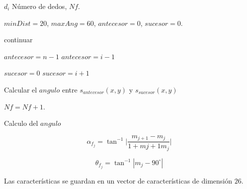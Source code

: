 \begin{algorithm}
\begin{algorithmic}[1]

\REQUIRE $d_i$
\ENSURE Número de dedos, $Nf$.  

	\STATE $minDist=20$, $maxAng=60$, $antecesor=0$, $sucesor=0$. 	
	
	\STATE continuar
	\ENDIF 
	
	\STATE $antecesor=n-1$
	\ELSE
	\STATE $antecesor=i-1$
	\ENDIF 

	\STATE $sucesor=0$
	\ELSE
	\STATE $sucesor=i+1$
	\ENDIF   
	
	\STATE Calcular el $angulo$ entre $s_{antecesor}(x,y)$ y $s_{sucesor}(x,y)$
	
	\RETURN \FALSE
	\ENDIF  
	
	\STATE $Nf=Nf+1$.

\ENDFOR 

\end{algorithmic}
\end{algorithm}


Calculo del $angulo$

$$ \alpha_{f_j} = \tan^{-1}{ \bigg| \frac{m_{j+1}-m_j}{1+m{j+1}m_j} \bigg|}$$

$$ \theta_{f_j} = \tan^{-1} | {m_j} - 90^\circ |$$


 

%


Las características se guardan en un vector de características de dimensión $26$.

